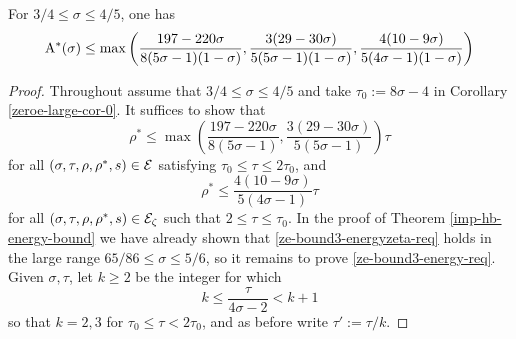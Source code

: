 \begin{theorem}\label{imp-energy-bound3}
For $3/4 \le \sigma \le 4/5$, one has 
\[
\mathrm{A}^*(\sigma) \le \max\left(\frac{197 - 220\sigma}{8(5\sigma - 1)(1 - \sigma)}, \frac{3(29 - 30\sigma)}{5(5\sigma - 1)(1 - \sigma)}, \frac{4(10 - 9\sigma)}{5(4\sigma - 1)(1 - \sigma)}\right)
\]
\end{theorem}

\derived 
{}

\begin{proof}
Throughout assume that $3/4 \le \sigma \le 4/5$ and take $\tau_0 := 8\sigma - 4$ in Corollary \ref{zeroe-large-cor-0}. It suffices to show that 
\begin{equation}\label{ze-bound3-energy-req}
\rho^* \le \max\left(\frac{197 - 220\sigma}{8(5\sigma - 1)}, \frac{3(29 - 30\sigma)}{5(5\sigma - 1)}\right)\tau
\end{equation}
for all $(\sigma, \tau, \rho, \rho^*, s) \in \mathcal{E}$ satisfying $\tau_0 \le \tau \le 2\tau_0$, and 
\begin{equation}\label{ze-bound3-energyzeta-req}
\rho^* \le \frac{4(10 - 9\sigma)}{5(4\sigma - 1)}\tau
\end{equation}
for all $(\sigma, \tau, \rho, \rho^*, s) \in \mathcal{E}_\zeta$ such that $2 \le \tau \le \tau_0$.
In the proof of Theorem \ref{imp-hb-energy-bound} we have already shown that \eqref{ze-bound3-energyzeta-req} holds in the large range $65/86 \le \sigma \le 5/6$, so it remains to prove \eqref{ze-bound3-energy-req}. Given $\sigma, \tau$, let $k \ge 2$ be the integer for which 
\begin{equation}
\label{ze-bound3-kdefn}
k \le \frac{\tau}{4\sigma - 2} < k + 1
\end{equation}
so that $k = 2, 3$ for $\tau_0 \le \tau < 2\tau_0$, and as before write $\tau' := \tau/k$. 


\end{proof}
